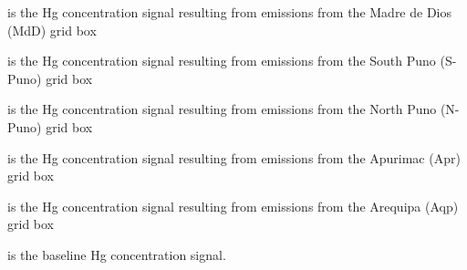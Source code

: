 \begin{description}[leftmargin=!,labelwidth={5 em}]
    \item [$Hg_{m(MdD)}$] is the Hg concentration signal resulting from emissions from the Madre de Dios (MdD) grid box
    \item [$Hg_{m(S-Puno)}$] is the Hg concentration signal resulting from emissions from the South Puno (S-Puno) grid box
    \item [$Hg_{m(N-Puno)}$] is the Hg concentration signal resulting from emissions from the North Puno (N-Puno) grid box
    \item [$Hg_{m(Apr)}$] is the Hg concentration signal resulting from emissions from the Apurimac (Apr) grid box
    \item [$Hg_{m(Aqp)}$] is the Hg concentration signal resulting from emissions from the Arequipa (Aqp) grid box
    \item [$Hg_{m_0}$] is the baseline Hg concentration signal.
\end{description}

